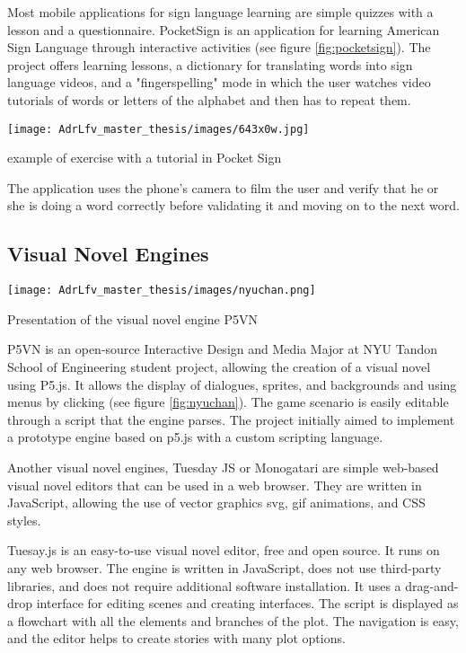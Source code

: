 Most mobile applications for sign language learning are simple quizzes with a lesson and a questionnaire. PocketSign is an application for learning American Sign Language through interactive activities (see figure \ref{fig:pocketsign}). 
The project offers learning lessons, a dictionary for translating words into sign language videos, and a "fingerspelling" mode in which the user watches video tutorials of words or letters of the alphabet and then has to repeat them. 

\begin{marginfigure}
    \centering
    \texttt{[image: AdrLfv\_master\_thesis/images/643x0w.jpg]}
    \caption{example of exercise with a tutorial in Pocket Sign}
    \label{fig:pocketsign}
\end{marginfigure}

The application uses the phone's camera to film the user and verify that he or she is doing a word correctly before validating it and moving on to the next word.

\subsection{Visual Novel Engines}

\begin{marginfigure}
    \centering
    \texttt{[image: AdrLfv\_master\_thesis/images/nyuchan.png]}
    \caption{Presentation of the visual novel engine P5VN}
    \label{fig:nyuchan}
\end{marginfigure}

P5VN is an open-source Interactive Design and Media Major at NYU Tandon School of Engineering student project, allowing the creation of a visual novel using P5.js. It allows the display of dialogues, sprites, and backgrounds and using menus by clicking (see figure \ref{fig:nyuchan}). The game scenario is easily editable through a script that the engine parses. The project initially aimed to implement a prototype engine based on p5.js with a custom scripting language.  

Another visual novel engines, Tuesday JS \cite{TuesdayJS} or Monogatari \cite{monogatari} are simple web-based visual novel editors that can be used in a web browser. They are written in JavaScript, allowing the use of vector graphics svg, gif animations, and CSS styles.

Tuesay.js is an easy-to-use visual novel editor, free and open source. It runs on any web browser. The engine is written in JavaScript, does not use third-party libraries, and does not require additional software installation. It uses a drag-and-drop interface for editing scenes and creating interfaces. The script is displayed as a flowchart with all the elements and branches of the plot. The navigation is easy, and the editor helps to create stories with many plot options.

